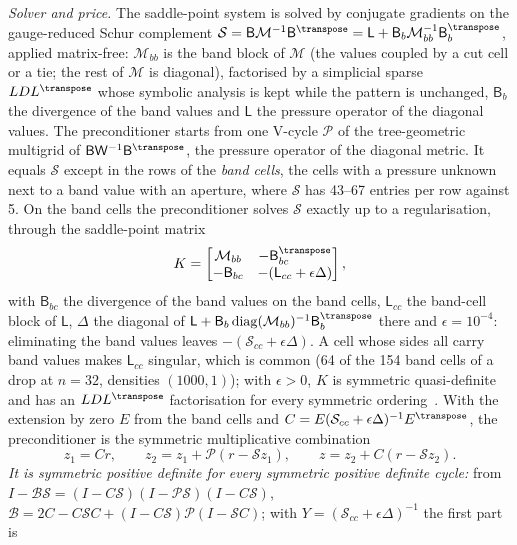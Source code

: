 \emph{Solver and price.} The saddle-point system is solved by conjugate
gradients on the gauge-reduced Schur complement
$\mathcal S=\mathsf B\mathcal M^{-1}\mathsf B^{\transpose}
=\mathsf L+\mathsf B_b\mathcal M_{bb}^{-1}\mathsf B_b^{\transpose}$, applied
matrix-free: $\mathcal M_{bb}$ is the band block of $\mathcal M$ (the values
coupled by a cut cell or a tie; the rest of $\mathcal M$ is diagonal),
factorised by a simplicial sparse $LDL^{\transpose}$ whose symbolic analysis
is kept while the pattern is unchanged, $\mathsf B_b$ the divergence of the
band values and $\mathsf L$ the pressure operator of the diagonal values. The
preconditioner starts from one V-cycle $\mathcal P$ of the tree-geometric
multigrid of $\mathsf B\mathsf W^{-1}\mathsf B^{\transpose}$, the pressure
operator of the diagonal metric. It equals $\mathcal S$ except in the rows of
the \emph{band cells}, the cells with a pressure unknown next to a band value
with an aperture, where $\mathcal S$ has 43--67 entries per row against 5. On
the band cells the preconditioner solves $\mathcal S$ exactly up to a
regularisation, through the saddle-point matrix
\[
  K=\begin{bmatrix}\mathcal M_{bb}&-\mathsf B_{bc}^{\transpose}\\
    -\mathsf B_{bc}&-(\mathsf L_{cc}+\epsilon\Delta)\end{bmatrix},
\]
with $\mathsf B_{bc}$ the divergence of the band values on the band cells,
$\mathsf L_{cc}$ the band-cell block of $\mathsf L$, $\Delta$ the diagonal of
$\mathsf L+\mathsf B_b\operatorname{diag}(\mathcal M_{bb})^{-1}\mathsf B_b^{\transpose}$
there and $\epsilon=10^{-4}$: eliminating the band values leaves
$-(\mathcal S_{cc}+\epsilon\Delta)$. A cell whose sides all carry band values
makes $\mathsf L_{cc}$ singular, which is common (64 of the 154 band cells of
a drop at $n=32$, densities $(1000,1)$); with $\epsilon>0$, $K$ is symmetric
quasi-definite and has an $LDL^{\transpose}$ factorisation for every
symmetric ordering~\cite{vanderbei1995}. With the extension by zero $E$ from
the band cells and $C=E(\mathcal S_{cc}+\epsilon\Delta)^{-1}E^{\transpose}$,
the preconditioner is the symmetric multiplicative combination
\[
  z_1=Cr,\qquad z_2=z_1+\mathcal P(r-\mathcal Sz_1),\qquad
  z=z_2+C(r-\mathcal Sz_2).
\]
\emph{It is symmetric positive definite for every symmetric positive definite
cycle:} from $I-\mathcal B\mathcal S=(I-C\mathcal S)(I-\mathcal P\mathcal S)(I-C\mathcal S)$,
$\mathcal B=2C-C\mathcal SC+(I-C\mathcal S)\mathcal P(I-\mathcal SC)$; with
$Y=(\mathcal S_{cc}+\epsilon\Delta)^{-1}$ the first part is

